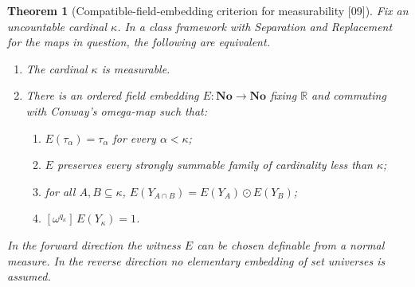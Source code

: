 \documentclass[11pt,letterpaper]{article}
\numberwithin{equation}{section}
\newtheorem{theorem}{Theorem}[section]
\theoremstyle{definition}
\theoremstyle{remark}
\newcommand{\No}{\mathbf{No}}
\newcommand{\R}{\mathbb R}
\newcommand{\coef}[2]{[\omega^{#1}]\,#2}
\newcommand{\src}[1]{\textup{\textsf{\small[#1]}}}%
\begin{document}
\begin{theorem}[Compatible-field-embedding criterion for measurability \src{09}]
\label{lce:sg:thm:numerical}
Fix an uncountable cardinal $\kappa$. In a class framework with Separation
and Replacement for the maps in question, the following are equivalent.
\begin{enumerate}[label=\textup{(\roman*)}]
\item The cardinal $\kappa$ is measurable.
\item There is an ordered field embedding $E:\No\to\No$ fixing $\R$ and
commuting with Conway's omega-map such that:
\begin{enumerate}[label=\textup{(\alph*)}]
\item $E(\tau_\alpha)=\tau_\alpha$ for every $\alpha<\kappa$;
\item $E$ preserves every strongly summable family of cardinality less than
$\kappa$;
\item for all $A,B\subseteq\kappa$, $E(Y_{A\cap B})=E(Y_A)\odot E(Y_B)$;
\item $\coef{q_\kappa}{E(Y_\kappa)}=1$.
\end{enumerate}
\end{enumerate}
In the forward direction the witness $E$ can be chosen definable from a
normal measure. In the reverse direction no elementary embedding of set
universes is assumed.
\end{theorem}
\end{document}
